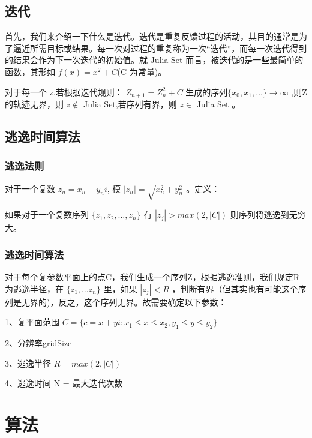 \documentclass{ctexart}
\begin{document}
\subsection{迭代}

首先，我们来介绍一下什么是迭代。迭代是重复反馈过程的活动，其目的通常是为了逼近所需目标或结果。每一次对过程的重复称为一次“迭代”，而每一次迭代得到的结果会作为下一次迭代的初始值。就 Julia Set 而言，被迭代的是一些最简单的函数，其形如 $f(x) = x^2 + C$(C 为常量)。

对于每一个 z,若根据迭代规则： $Z_{n+1} = Z_n^2 + C$ 生成的序列$\{x_0, x_1,\dots\} \rightarrow \infty$ ,则Z的轨迹无界，则 $z \notin$  Julia Set,若序列有界，则 $z \in$ Julia Set 。

\subsection{逃逸时间算法}
\subsubsection{逃逸法则}

对于一个复数 $z_n = x_n + y_ni$, 模 $|z_n| = \sqrt{x_n^2 + y_n^2}$ 。定义：

如果对于一个复数序列 $\{z_1, z_2, \dots, z_n\}$ 有 $|z_j| > max(2,|C|)$ 则序列将逃逸到无穷大。

\subsubsection{逃逸时间算法}

对于每个复参数平面上的点C，我们生成一个序列Z，根据逃逸准则，我们规定R为逃逸半径，在 $\{z_1, \dots z_n\}$ 里，如果 $|z_j| < R$ ，判断有界（但其实也有可能这个序列是无界的)，反之，这个序列无界。故需要确定以下参数：

1、复平面范围 $C = \{c = x + yi: x_1 \le x \le x_2, y_1 \le y \le y_2 \}$
  
2、分辨率gridSize

3、逃逸半径 $R = max(2, |C|)$

4、逃逸时间 N = 最大迭代次数

\section{算法}
\end{document}
